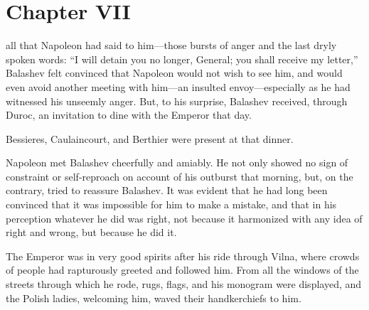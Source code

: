 
\chapter*{Chapter VII}
\ifaudio     
{} 
\fi

 all that Napoleon had said to him---those bursts of anger
and the last dryly spoken words: ``I will detain you no longer,
General; you shall receive my letter,'' Balashev felt convinced
that Napoleon would not wish to see him, and would even avoid
another meeting with him---an insulted envoy---especially as he
had witnessed his unseemly anger. But, to his surprise, Balashev
received, through Duroc, an invitation to dine with the Emperor
that day.

Bessieres, Caulaincourt, and Berthier were present at that
dinner.

Napoleon met Balashev cheerfully and amiably. He not only showed
no sign of constraint or self-reproach on account of his outburst
that morning, but, on the contrary, tried to reassure
Balashev. It was evident that he had long been convinced that it
was impossible for him to make a mistake, and that in his
perception whatever he did was right, not because it harmonized
with any idea of right and wrong, but because he did it.

The Emperor was in very good spirits after his ride through
Vilna, where crowds of people had rapturously greeted and
followed him. From all the windows of the streets through which
he rode, rugs, flags, and his monogram were displayed, and the
Polish ladies, welcoming him, waved their handkerchiefs to him.

